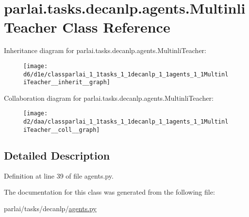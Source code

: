 \hypertarget{classparlai_1_1tasks_1_1decanlp_1_1agents_1_1MultinliTeacher}{}\section{parlai.\+tasks.\+decanlp.\+agents.\+Multinli\+Teacher Class Reference}
\label{classparlai_1_1tasks_1_1decanlp_1_1agents_1_1MultinliTeacher}


Inheritance diagram for parlai.\+tasks.\+decanlp.\+agents.\+Multinli\+Teacher\+:\nopagebreak
\begin{figure}[H]
\begin{center}
\leavevmode
\texttt{[image: d6/d1e/classparlai\_1\_1tasks\_1\_1decanlp\_1\_1agents\_1\_1MultinliTeacher\_\_inherit\_\_graph]}
\end{center}
\end{figure}


Collaboration diagram for parlai.\+tasks.\+decanlp.\+agents.\+Multinli\+Teacher\+:\nopagebreak
\begin{figure}[H]
\begin{center}
\leavevmode
\texttt{[image: d2/daa/classparlai\_1\_1tasks\_1\_1decanlp\_1\_1agents\_1\_1MultinliTeacher\_\_coll\_\_graph]}
\end{center}
\end{figure}


\subsection{Detailed Description}


Definition at line 39 of file agents.\+py.



The documentation for this class was generated from the following file\+:\begin{DoxyCompactItemize}
\item 
parlai/tasks/decanlp/\hyperlink{parlai_2tasks_2decanlp_2agents_8py}{agents.\+py}\end{DoxyCompactItemize}

